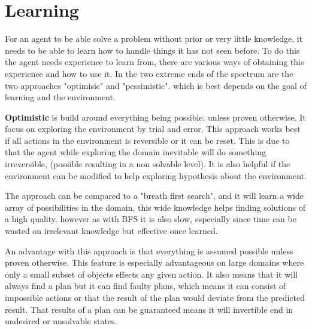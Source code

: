 \chapter{Learning}
	For an agent to be able solve a problem without prior or very little knowledge, it needs to be able to learn how to handle things it has not seen before. To do this the agent needs experience to learn from, there are various ways of obtaining this experience and how to use it. In the two extreme ends of the spectrum are the two approaches "optimisic" and "pessimistic". which is best depends on the goal of learning and the environment.
	
	\textbf{Optimistic} is build around everything being possible, unless proven otherwise. It focus on exploring the environment by trial and error. This approach works best if all actions in the environment is reversible or it can be reset. This is due to that the agent while exploring the domain inevitable will do something irreversible, (possible resulting in a non solvable level). It is also helpful if the environment can be modified to help exploring hypothesis about the environment.
		
	The approach can be compared to a "breath first search", and it will learn a wide array of possibilities in the domain, this wide knowledge helps finding solutions of a high quality. however as with BFS it is also slow, especially since time can be wasted on irrelevant knowledge but effective once learned.


	An advantage with this approach is that everything is assumed possible unless proven otherwise. This feature is especially advantageous on large domains where only a small subset of objects effects any given action. It also means that it will always find a plan but it can find faulty plans, which means it can consist of impossible actions or that the result of the plan would deviate from the predicted result. That results of a plan can be guaranteed means it will invertible end in undesired or unsolvable states. 
				

		
		
